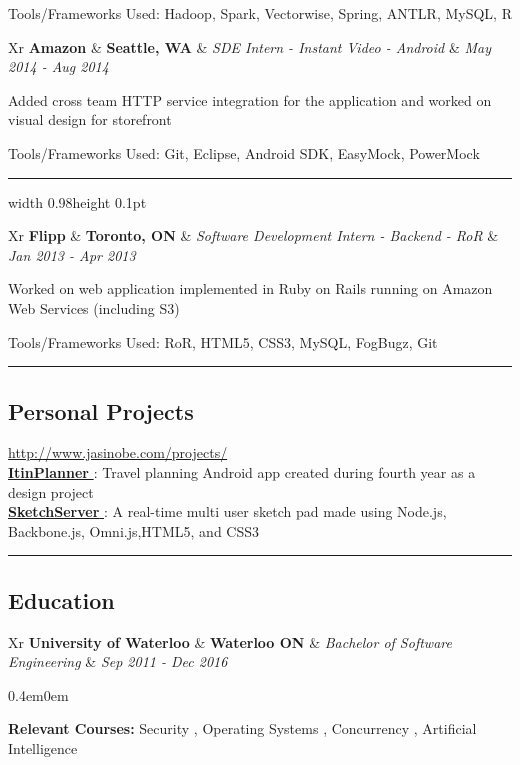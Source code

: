 \documentclass[11pt,letterpaper]{article}
\newcommand{\subsectioncustomend}[1]
{
\vspace{-0.8em}
\subsection*{#1}
}
\newcommand{\subsectioncustom}[1]
{
\hrule
\subsectioncustomend{#1}
}
\newcommand{\worksectionend}[5]
{
\begin{tabularx}{\textwidth}{Xr}
\textbf{#1}
&
\textbf{#2}
&
\emph{#3}
&
\emph{#4}
\end{tabularx}
\vspace{-1.2em}
{#5}
}
\newcommand{\worksection}[5]
{
\worksectionend{#1}{#2}{#3}{#4}{#5}
\vspace{-1.2em}
\textcolor{greyish}{\hrule width 0.98\textwidth height 0.1pt}
}
\newcommand{\schoolsectionend}[5]{
\worksectionend{#1}{#2}{#3}{#4}
{
\vspace{0.5em}

\begin{adjustwidth}{0.4em}{0em}

#5

\end{adjustwidth}
}

}
\begin{document}
\begin{flushleft}
{{\begin{itemize*}
{                \item { Tools/Frameworks Used: Hadoop, Spark, Vectorwise, Spring, ANTLR, MySQL, R }
        }
        \end{itemize*}
    }
}
{
\worksection
    {
        Amazon
    }
    {
        Seattle, WA
    }
    {
        SDE Intern - Instant Video - Android
    }
    {
        May 2014
        - Aug 2014
    }
    {
        \begin{itemize*}
        {
                \item { Added cross team HTTP service integration for the application and worked on visual design for storefront }
                \item { Tools/Frameworks Used: Git, Eclipse, Android SDK, EasyMock, PowerMock }
        }
        \end{itemize*}
    }
}
{
\worksectionend
    {
        Flipp
    }
    {
        Toronto, ON
    }
    {
        Software Development Intern - Backend - RoR
    }
    {
        Jan 2013
        - Apr 2013
    }
    {
        \begin{itemize*}
        {
                \item { Worked on web application implemented in Ruby on Rails running on Amazon Web Services (including S3) }
                \item { Tools/Frameworks Used: RoR, HTML5, CSS3, MySQL, FogBugz, Git }
        }
        \end{itemize*}
    }
}

\end{flushleft}


\subsectioncustom{Personal Projects}
\vspace{-0.5em}
\begin{flushleft}
    {
        \textcolor{greyish}{ \href{ http://www.jasinobe.com/projects/ }{ http://www.jasinobe.com/projects/ }}
    }
        \\
        {
        \href{ https://play.google.com/store/apps/details?id=com.jbap.itinplanner }{\textbf{ ItinPlanner }}: Travel planning Android app created during fourth year as a design project
        }
        \\
        {
        \href{ http://git.io/tuKCsQ }{\textbf{ SketchServer }}: A real-time multi user sketch pad made using Node.js, Backbone.js, Omni.js,HTML5, and CSS3
        }
\end{flushleft}




\subsectioncustom{Education}
\begin{flushleft}
    \schoolsectionend
    {
      University of Waterloo
    }
    {
    Waterloo ON
    }
    {
    Bachelor of Software Engineering
    }
    {
        Sep 2011
        - Dec 2016
    }
    {
        \textbf{Relevant Courses:}
             Security
            ,  Operating Systems
            ,  Concurrency
            ,  Artificial Intelligence
    }
\end{flushleft}
\end{document}
